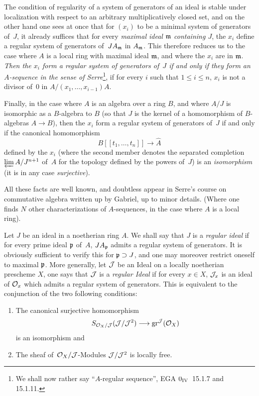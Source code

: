 \begin{remarks}
The
condition of regularity of a system of
generators of an ideal is stable under localization with respect to an
arbitrary multiplicatively closed set, and on the other hand one sees
at once that for $(x_i)$ to be a minimal system of
generators of~$J$, it already suffices that for every
\emph{maximal ideal $\goth{m}$ containing $J$}, the $x_i$ define a
regular system of generators of~$JA_{\goth{m}}$ in
$A_{\goth{m}}$. This therefore reduces us to the case where $A$ is a
local ring with maximal ideal $\goth{m}$, and where the $x_i$ are
in $\goth{m}$. \emph{Then the $x_i$ form a
regular system of generators of~$J$ if and only if they
form an $A$-sequence in the sense of Serre}\footnote{We shall
now rather say ``$A$-regular sequence'', \cf EGA
$0_{\textup{IV}}$~15.1.7 and 15.1.11.}, \ie if for every $i$ such that $1
\leq i \leq n$, $x_i$ is not a divisor of~$0$ in
$A/(x_1,\dots,x_{i-1})A$.

Finally, in the case where $A$ is an algebra over a ring $B$,
and where $A/J$ is isomorphic as a $B$-algebra to $B$ (so
that $J$ is the kernel of a homomorphism of $B$-algebras
$A\to B$), then the $x_i$ form a regular system of
generators of~$J$ if and only if the canonical
homomorphism
\[
B[[t_1,\dots,t_n]]\to \hat{A}
\]
defined by the $x_i$ (where the second member denotes the
separated completion $\varprojlim A/J^{n+1}$ of~$A$ for the
topology defined by the powers of~$J$) is an
\emph{isomorphism} (it is in any case \emph{surjective}).

All these facts are well known, and doubtless appear in Serre's
course on commutative algebra written up by Gabriel, up
to minor details. (Where one finds $N$ other
characterizations of $A$-sequences, in the case where $A$ is a
local ring).

Let $J$ be an ideal in a noetherian ring $A$. We shall say that
$J$ is a \emph{regular ideal}
if for every prime ideal $\goth{p}$ of~$A$, $JA_{\goth{p}}$ admits
a regular system of generators. It is
obviously sufficient to verify this for $\goth{p} \supset J$, and one may
moreover restrict oneself to maximal $\goth{p}$. More generally,
let $\cal{J}$ be an Ideal on a locally
noetherian prescheme $X$, one says that $\cal{J}$ is a \emph{regular
Ideal} if for every $x\in X$, $\cal{J}_x$ is an ideal of
$\cal{O}_x$ which admits a regular system of
generators. This is equivalent to the conjunction of the two
following conditions:
\begin{enumerate}
\item[(a)] The canonical surjective homomorphism
\[
S_{\cal{O}_X/\cal{J}}(\cal{J}/\cal{J}^2) \to \gr^{\cal{J}}(\cal{O}_X)
\]
is an isomorphism and
\item[(b)] The sheaf of~$\cal{O}_X/\cal{J}$-Modules
$\cal{J}/\cal{J}^2$ is locally free.
\end{enumerate}


\end{remarks}
